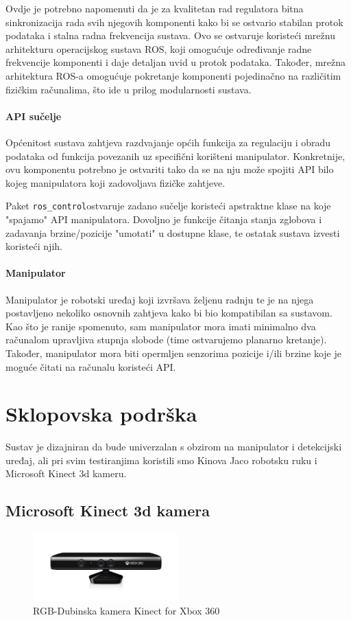 \documentclass[times, utf8, diplomski, numeric]{fer}
\begin{document}
Ovdje je potrebno napomenuti da je za kvalitetan rad regulatora bitna sinkronizacija rada svih njegovih komponenti kako bi se ostvario stabilan protok podataka i stalna radna frekvencija sustava.
Ovo se ostvaruje koristeći mrežnu arhitekturu operacijskog sustava ROS, koji omogućuje određivanje radne frekvencije komponenti i daje detaljan uvid u protok podataka.
Također, mrežna arhitektura ROS-a omogućuje pokretanje komponenti pojedinačno na različitim fizičkim računalima, što ide u prilog modularnosti sustava.

\subsubsection{API sučelje}
Općenitost sustava zahtjeva razdvajanje općih funkcija za regulaciju i obradu podataka od funkcija povezanih uz specifični korišteni manipulator.
Konkretnije, ovu komponentu potrebno je ostvariti tako da se na nju može spojiti API bilo kojeg manipulatora koji zadovoljava fizičke zahtjeve.

Paket \texttt{ros\_control}ostvaruje zadano sučelje koristeći apstraktne klase na koje "spajamo" API manipulatora.
Dovoljno je funkcije čitanja stanja zglobova i zadavanja brzine/pozicije "umotati" u dostupne klase, te ostatak sustava izvesti koristeći njih.

\subsubsection{Manipulator}
Manipulator je robotski uređaj koji izvršava željenu radnju te je na njega postavljeno nekoliko osnovnih zahtjeva kako bi bio kompatibilan sa sustavom.
Kao što je ranije spomenuto, sam manipulator mora imati minimalno dva računalom upravljiva stupnja slobode (time ostvarujemo planarno kretanje).
Također, manipulator mora biti opermljen senzorima pozicije i/ili brzine koje je moguće čitati na računalu koristeći API.

\chapter{Sklopovska podrška}
Sustav je dizajniran da bude univerzalan s obzirom na manipulator i detekcijski uređaj, ali pri svim testiranjima koristili smo Kinova Jaco robotsku ruku i Microsoft Kinect 3d kameru.
\section{Microsoft Kinect 3d kamera}\label{sec:kinect}
\begin{figure}[h!]
    \centering
    \includegraphics[width=0.5\textwidth]{detekcija/kinect}
	\caption{RGB-Dubinska kamera Kinect for Xbox 360}
	\label{fig:kinect}
\end{figure}
\end{document}
